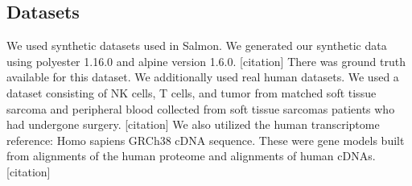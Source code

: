 \subsection{Datasets}
We used synthetic datasets used in Salmon. 
We generated our synthetic data using polyester 1.16.0 and alpine version 1.6.0. 
[citation] There was ground truth available for this dataset. We additionally used real human datasets. 
We used a dataset consisting of NK cells, T cells, and tumor from matched soft tissue sarcoma and peripheral 
blood collected from soft tissue sarcomas patients who had undergone surgery. 
[citation] We also utilized the human transcriptome reference: Homo sapiens GRCh38 cDNA sequence. 
These were gene models built from alignments of the human proteome and alignments of human cDNAs. [citation]
